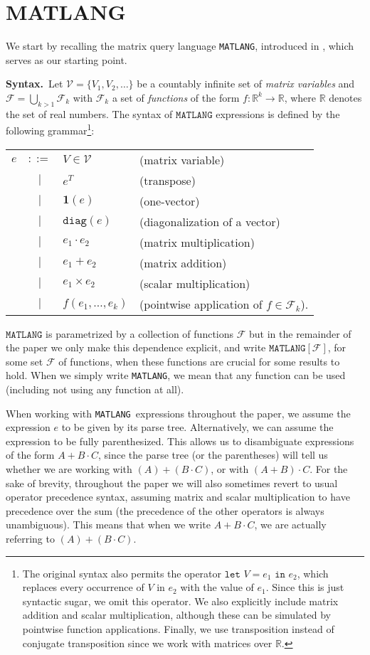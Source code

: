 \documentclass[sigconf]{acmart}
\newcommand{\RR}{\mathbb{R}}
\newcommand{\Mvar}{\mathcal{V}}
\newcommand{\Fun}{\mathcal{F}}
\newcommand{\llet}{\texttt{let } V = e_1 \texttt{ in } e_2}
\newcommand{\ones}{\mathbf{1}}
\newcommand{\diag}{\texttt{diag}}
\newcommand{\lang}{\texttt{MATLANG}\xspace}
\newcommand{\langf}[1]{\texttt{MATLANG}[#1]}
\begin{document}
\section{MATLANG}\label{sec:matlang}
We start by recalling the matrix query language \lang, introduced in \cite{matlang-journal}, which serves as our starting point.

\smallskip
\noindent
\textbf{Syntax.}\,  Let $\Mvar = \{V_1, V_2, \ldots\}$ be a countably infinite set of \textit{matrix variables} and $\Fun=\bigcup_{k>1}\Fun_k$ with
$\Fun_k$ a set of \textit{functions} of the  form $f:\RR^k \to \RR$, where $\RR$ denotes the set of real numbers. The syntax of $\lang$ expressions is defined by the following grammar\footnote{The original syntax also permits the operator $\llet$, which replaces every occurrence of $V$ in $e_2$ with the value of $e_1$. Since this is just syntactic sugar, we omit this operator. We also explicitly include matrix addition and scalar multiplication, although these can be simulated by pointwise function applications. Finally, we use transposition instead of conjugate transposition since we work with matrices over $\RR$.}:


\begin{tabular}{lcll}
$e$ & $::=$ & $V\in \Mvar$ & (matrix variable)\\
 & $|$ & $e^T$ & (transpose)\\ 
 & $|$ & $\ones(e)$ & (one-vector)\\ 
 & $|$ & $\diag(e)$ & (diagonalization of a vector)\\  
 & $|$ & $e_1 \cdot e_2$ & (matrix multiplication)\\   
 & $|$ & $e_1 + e_2$ & (matrix addition)\\   
 & $|$ & $e_1\times e_2$ & (scalar multiplication)\\
 & $|$ & $f(e_1,\ldots ,e_k)$ & (pointwise application of $f\in\Fun_k$).    
\end{tabular}
\vspace{1ex}

$\lang$ is parametrized by a collection of functions $\Fun$ but in the remainder of the paper we only make this dependence explicit, and write $\langf{\Fun}$, for some set $\Fun$ of functions, when these functions are crucial for some results to hold. When we simply write \lang, we mean that any function can be used (including not using any function at all).

When working with \lang\ expressions throughout the paper, we assume the expression $e$ to be given by its parse tree. Alternatively, we can assume the expression to be fully parenthesized. This allows us to disambiguate expressions of the form $A + B\cdot C$, since the parse tree (or the parentheses) will tell us whether we are working with $(A) + (B\cdot C)$, or with $(A+B)\cdot C$. For the sake of brevity, throughout the paper we will also sometimes revert to usual operator precedence syntax, assuming matrix and scalar multiplication to have precedence over the sum (the precedence of the other operators is always unambiguous). This means that when we write $A + B\cdot C$, we are actually referring to $(A) + (B\cdot C)$.
\end{document}
